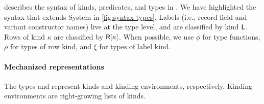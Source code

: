 \documentclass[sigplan,screen]{acmart}
\begin{document}
 describes the syntax of kinds, predicates, and types in \Rome. We have highlighted the syntax that extends System \Fome in \cref{fig:syntax-types}. Labels (i.e., record field and variant constructor names) live at the type level, and are classified by kind $\mathsf{L}$. Rows of kind $\kappa$ are classified by $\mathsf{R}[{\kappa}]$. When possible, we use $\phi$ for type functions, $\rho$ for types of row kind, and $\xi$ for types of label kind. 

 \paragraph{Mechanized representations } The types  and  represent kinds and kinding environments, respectively. Kinding environments are right-growing lists of kinds.

\begin{code}[hide]%
\>[0]\AgdaSpace{}%
\AgdaSpace{}%
\<%
\end{code}
\begin{code}%
\>[0][@{}l@{\AgdaIndent{1}}]%
\>[2]\AgdaSpace{}%
\AgdaSpace{}%
\AgdaSymbol{:}\AgdaSpace{}%
\<%
\\
%
\>[2]\AgdaSpace{}%
\AgdaSpace{}%
\AgdaSymbol{:}\AgdaSpace{}%
\AgdaSpace{}%
\<%
\\
\>[2][@{}l@{\AgdaIndent{0}}]%
\>[4]\AgdaSpace{}%
\AgdaSymbol{:}\AgdaSpace{}%
\<%
\\
%
\>[4]\AgdaOperator{\AgdaInductiveConstructor{\AgdaUnderscore{},\AgdaUnderscore{}}}\AgdaSpace{}%
\AgdaSymbol{:}\AgdaSpace{}%
\AgdaSpace{}%
\AgdaSpace{}%
\AgdaSpace{}%
\AgdaSpace{}%
\<%
\end{code}
\begin{code}[hide]%
%
\>[2]\AgdaSpace{}%
\AgdaSpace{}%
\<%
\\
\>[2][@{}l@{\AgdaIndent{0}}]%
\>[4]\AgdaSpace{}%
\AgdaSpace{}%
\AgdaSymbol{:}\AgdaSpace{}%
\<%
\\
%
\>[4]\AgdaSpace{}%
\AgdaSymbol{:}\AgdaSpace{}%
\AgdaSpace{}%
\AgdaSpace{}%
\AgdaSpace{}%
\AgdaSpace{}%
\<%
\\
%
\>[4]\AgdaSpace{}%
\AgdaSymbol{:}\AgdaSpace{}%
\AgdaSpace{}%
\AgdaSpace{}%
\<%
\end{code}
\end{document}
